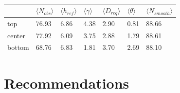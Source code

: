 \begin{table}
\begin{center}
\begin{tabular}{|l|llllll|}
\hline
& $\langle N_{obs} \rangle$ & $\langle h_{ref} \rangle$ &$\langle \gamma
  \rangle$ & $\langle D_{req} \rangle$ & $\langle \theta \rangle$ & $\langle
  N_{smooth} \rangle$ \\\hline
top & 76.93 & 6.86 & 4.38 & 2.90 & 0.81 & 88.66\\
center & 77.92 & 6.09 & 3.75 & 2.88 & 1.79 & 88.61\\
bottom & 68.76 & 6.83 & 1.81 & 3.70 & 2.69 & 88.10\\
\hline
\end{tabular}
\end{center}
\caption{\label{tbl:roc_pos}}
\end{table}

\section{Recommendations}
